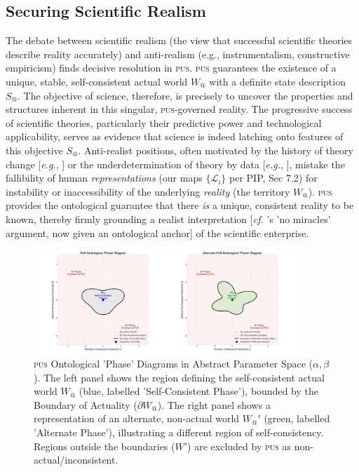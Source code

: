\documentclass[11pt, a4paper]{article}
\makeatletter
\newcommand{\pus}{\textsc{pus}} %
\newcommand{\Wactual}{W_{@}} %
\newcommand{\Sactual}{S_{@}} %
\newcommand{\LangSet}{\{\mathcal{L}_i\}} %
\makeatother
\begin{document}
\subsection{Securing Scientific Realism}
The debate between scientific realism (the view that successful scientific theories describe reality accurately) and anti-realism (e.g., instrumentalism, constructive empiricism) finds decisive resolution in \pus. \pus{} guarantees the existence of a unique, stable, self-consistent actual world $\Wactual$ with a definite state description $\Sactual$. The objective of science, therefore, is precisely to uncover the properties and structures inherent in this singular, \pus-governed reality. The progressive success of scientific theories, particularly their predictive power and technological applicability, serves as evidence that science is indeed latching onto features of this objective $\Sactual$. Anti-realist positions, often motivated by the history of theory change [\textit{e.g.}, \citealp{laudan1981}] or the underdetermination of theory by data [\textit{e.g.}, \citealp{vanfraassen1980}], mistake the fallibility of human \textit{representations} (our maps $\LangSet$ per PIP, Sec 7.2) for instability or inaccessibility of the underlying \textit{reality} (the territory $\Wactual$). \pus{} provides the ontological guarantee that there \textit{is} a unique, consistent reality to be known, thereby firmly grounding a realist interpretation [\textit{cf.} \citealp{putnam1975}'s 'no miracles' argument, now given an ontological anchor] of the scientific enterprise.

\FloatBarrier

\begin{figure}[htbp]
    \centering
    \includegraphics[width=0.9\textwidth]{figures/pus_double_phase_diagram.png} %
    \caption{\pus{} Ontological 'Phase' Diagrams in Abstract Parameter Space ($\alpha, \beta$). The left panel shows the region defining the self-consistent actual world $\Wactual$ (blue, labelled 'Self-Consistent Phase'), bounded by the Boundary of Actuality ($\partial \Wactual$). The right panel shows a representation of an alternate, non-actual world $\Wactual'$ (green, labelled 'Alternate Phase'), illustrating a different region of self-consistency. Regions outside the boundaries ($W'$) are excluded by \pus{} as non-actual/inconsistent.}
    \label{fig:phase2d}
\end{figure}
\FloatBarrier 
\end{document}
